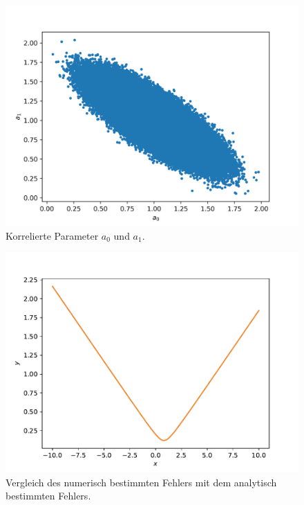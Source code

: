 \documentclass[a4paper, 11pt]{article}
\begin{document}
\FloatBarrier

\begin{figure}
    \centering
    \includegraphics[width=\textwidth]{../A23/A23_scatter.png}
    \caption{Korrelierte Parameter $a_0$ und $a_1$.}
\end{figure}
\begin{figure}
    \centering
    \includegraphics[width=\textwidth]{../A23/A23_resultat.pdf}
    \caption{Vergleich des numerisch bestimmten Fehlers mit dem analytisch bestimmten Fehlers.}
\end{figure}
\FloatBarrier
\end{document}
